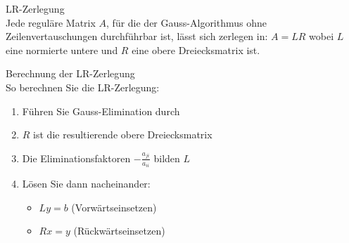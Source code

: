 \begin{theorem}{LR-Zerlegung}\\
Jede reguläre Matrix $A$, für die der Gauss-Algorithmus ohne Zeilenvertauschungen durchführbar ist, lässt sich zerlegen in:
$A = LR$
wobei $L$ eine normierte untere und $R$ eine obere Dreiecksmatrix ist.
\end{theorem}

\begin{KR}{Berechnung der LR-Zerlegung}\\
So berechnen Sie die LR-Zerlegung:
\begin{enumerate}
    \item Führen Sie Gauss-Elimination durch
    \item $R$ ist die resultierende obere Dreiecksmatrix
    \item Die Eliminationsfaktoren $-\frac{a_{ji}}{a_{ii}}$ bilden $L$
    \item Lösen Sie dann nacheinander:
        \begin{itemize}
            \item $Ly = b$ (Vorwärtseinsetzen)
            \item $Rx = y$ (Rückwärtseinsetzen)
        \end{itemize}
\end{enumerate}
\end{KR}

